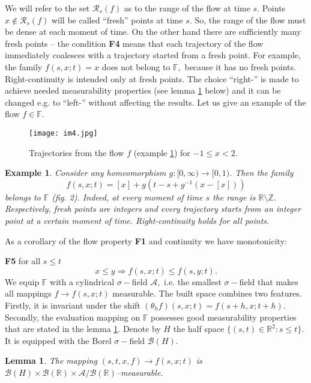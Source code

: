 \documentclass[a4paper,12pt]{article}
\newcommand{\1}{1\!\!\,{\rm I}}
\theoremstyle{plain}
\newtheorem{example}{Example}[section]
\newtheorem{lemma}{Lemma}[section]
\begin{document}
We will refer to the set $\mathcal{R}_s(f)$ as to the range of the flow at time $s.$ Points  $x\not\in\mathcal{R}_s(f)$ will be called  ``fresh'' points at time $s.$  So, the range of the flow must be dense at each moment of time. On the other hand there are sufficiently many fresh points -- the condition {\bf F4} means that each trajectory of the flow immediately coalesces with a trajectory started from a fresh point.  For example, the family $f(s,x;t)=x$ does not belong to $\mathbb{F},$ because it has no fresh points.  Right-continuity is intended only at fresh points. The choice ``right-'' is made to achieve needed measurability properties (see lemma \ref{lem1} below) and it can be changed e.g. to ``left-'' without affecting the results. Let us give an example of the flow $f\in \mathbb{F}.$ 


\begin{figure}[!h]
	\centering
	\caption{Trajectories from the flow $f$ (example \ref{ex10_1}) for $-1\leq x< 2$.}
	\texttt{[image: im4.jpg]}
\end{figure}


\begin{example}\label{ex10_1}
	Consider any homeomorphism  $g:[0,\infty)\to [0,1).$ Then the family
	$$
	f(s,x;t)=[x]+g(t-s+g^{-1}(x-[x]))
	$$
	belongs to $\mathbb{F}$ (fig. 2). Indeed, at every moment of time $s$ the range is $\mathbb{R}\setminus \mathbb{Z}.$ Respectively, fresh points are integers and every trajectory starts from an integer point at a certain moment of time. Right-continuity holds for all points.
	
	
\end{example}






As a corollary of the flow property {\bf F1} and continuity we have monotonicity:

{\bf F5} for all $s\leq t$
$$
x\leq y\Rightarrow f(s,x;t)\leq f(s,y;t).
$$
We equip $\mathbb{F}$ with a cylindrical $\sigma-$field $\mathcal{A},$ i.e. the smallest $\sigma-$field that makes all mappings $f\to f(s,x;t)$ measurable. The built space combines two features. Firstly, it is invariant under the shift $(\theta_h f)(s,x;t)=f(s+h,x;t+h).$ Secondly, the evaluation mapping on $\mathbb{F}$ possesses good measurability properties that are stated in the lemma \ref{lem1}. Denote by $H$ the half space $\{(s,t)\in\mathbb{R}^2:s\leq t\}.$ It is equipped with the Borel $\sigma-$field $\mathcal{B}(H).$

\begin{lemma}
	\label{lem1} The mapping $(s,t,x,f)\to f(s,x;t)$
	is $\mathcal{B}(H)\times\mathcal{B}(\mathbb{R})\times \mathcal{A}/\mathcal{B}(\mathbb{R})$--measurable.
	
\end{lemma}
\end{document}
